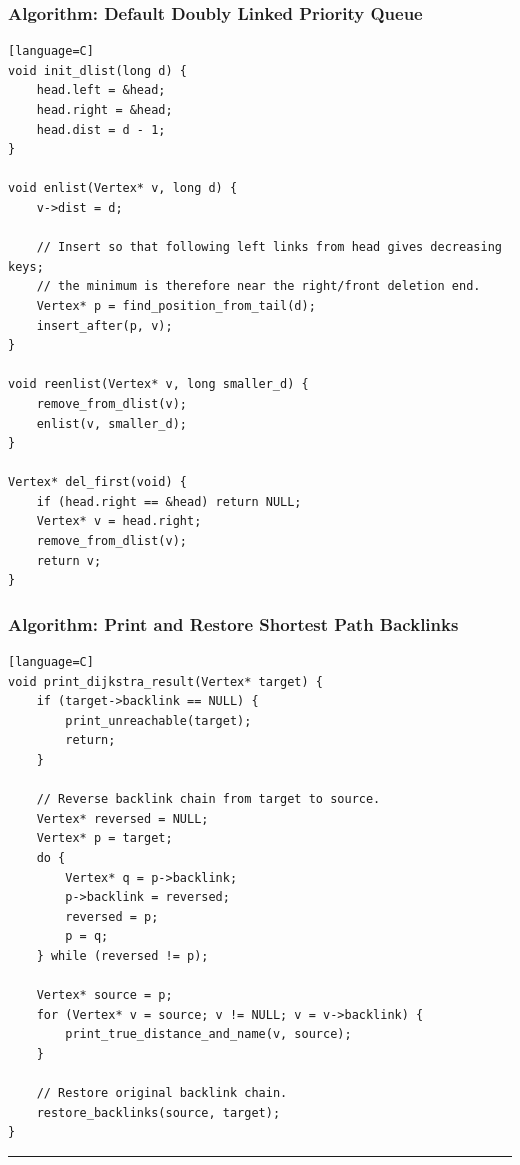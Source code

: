 \documentclass[11pt]{article}
\begin{document}
\subsubsection{Algorithm: Default Doubly Linked Priority Queue}\label{algorithm-default-doubly-linked-priority-queue}

\begin{verbatim}[language=C]
void init_dlist(long d) {
    head.left = &head;
    head.right = &head;
    head.dist = d - 1;
}

void enlist(Vertex* v, long d) {
    v->dist = d;

    // Insert so that following left links from head gives decreasing keys;
    // the minimum is therefore near the right/front deletion end.
    Vertex* p = find_position_from_tail(d);
    insert_after(p, v);
}

void reenlist(Vertex* v, long smaller_d) {
    remove_from_dlist(v);
    enlist(v, smaller_d);
}

Vertex* del_first(void) {
    if (head.right == &head) return NULL;
    Vertex* v = head.right;
    remove_from_dlist(v);
    return v;
}
\end{verbatim}

\subsubsection{Algorithm: Print and Restore Shortest Path Backlinks}\label{algorithm-print-and-restore-shortest-path-backlinks}

\begin{verbatim}[language=C]
void print_dijkstra_result(Vertex* target) {
    if (target->backlink == NULL) {
        print_unreachable(target);
        return;
    }

    // Reverse backlink chain from target to source.
    Vertex* reversed = NULL;
    Vertex* p = target;
    do {
        Vertex* q = p->backlink;
        p->backlink = reversed;
        reversed = p;
        p = q;
    } while (reversed != p);

    Vertex* source = p;
    for (Vertex* v = source; v != NULL; v = v->backlink) {
        print_true_distance_and_name(v, source);
    }

    // Restore original backlink chain.
    restore_backlinks(source, target);
}
\end{verbatim}

\begin{center}\rule{0.5\linewidth}{0.5pt}\end{center}
\end{document}
